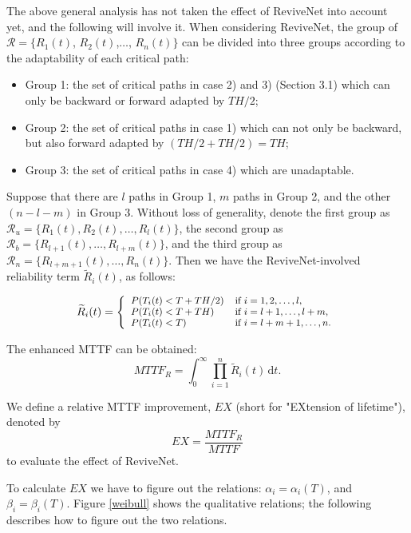 The above general analysis has not taken the effect of ReviveNet into account yet, and the following will involve it. When considering ReviveNet, the group of $\mathcal{R}=\{$$R_1(t)$, $R_2(t)$,$\ldots$, $R_n(t)\}$ can be divided into three groups according to the adaptability of each critical path:
\begin{itemize}
  \item Group 1: the set of critical paths in case 2) and 3) (Section 3.1) which can only be backward or forward adapted by $TH/2$;
  \item Group 2: the set of critical paths in case 1) which can not only be backward, but also forward adapted by $(TH/2+TH/2)=TH$;
  \item Group 3: the set of critical paths in case 4) which are unadaptable.
\end{itemize}

 Suppose that there are $l$ paths in Group 1, $m$ paths in Group 2, and the other $(n-l-m)$ in Group 3. Without  loss of generality, denote the first group as $\mathcal{R}_{u}=\{R_1(t), R_2(t),\ldots, R_l(t)\}$, the second group as $\mathcal{R}_{b}=\{R_{l+1}(t), \ldots, R_{l+m}(t)\}$, and the third group as $\mathcal{R}_{n}=\{R_{l+m+1}(t), \ldots, R_{n}(t)\}$. Then we have the ReviveNet-involved reliability term $\widetilde{R}_i(t)$, as follows:

\begin{equation}\label{new_term}
{\small
 \widetilde{R}_i(t)=\left\{
\begin{array}{ll}
P(T_i(t)<T+{TH}/{2}) & \mbox{if $i=1, 2, \ldots, l$,} \\
P(T_i(t)<T+ TH) & \mbox{if $i=l+1, \ldots, l+m$,} \\
P(T_i(t)<T) & \mbox{if $i=l+m+1, \ldots, n$.}
\end{array} \right.}
\end{equation}

The enhanced MTTF can be obtained:
\begin{equation}\label{mttfr}
MTTF_R = \int^\infty_0  \prod^n_{i=1} \widetilde{R}_i(t) \,\mbox{d}t.
\end{equation}

We define a relative MTTF improvement, $EX$ (short for "EXtension of lifetime"),  denoted by
\begin{equation}
  EX=\frac{MTTF_R}{MTTF}
\end{equation}
to evaluate the effect of ReviveNet.

To calculate $EX$ we have to figure out the relations: $\alpha_i=\alpha_i(T)$, and $\beta_i=\beta_i(T)$. Figure \ref{weibull} shows the qualitative relations; the following describes how to figure out the two relations.


